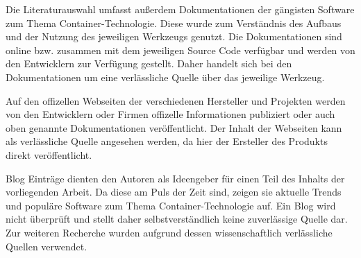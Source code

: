 Die  Literaturauswahl umfasst außerdem Dokumentationen der gängisten Software zum Thema Container-Technologie.
Diese wurde zum Verständnis des Aufbaus und der Nutzung des jeweiligen Werkzeugs genutzt. 
Die Dokumentationen sind online bzw. zusammen mit dem jeweiligen Source Code verfügbar und werden von den Entwicklern zur  Verfügung gestellt. 
Daher handelt sich bei den Dokumentationen um eine verlässliche Quelle über das jeweilige Werkzeug.


Auf den offizellen Webseiten der verschiedenen Hersteller und Projekten werden von den Entwicklern oder Firmen offizelle Informationen publiziert oder auch oben genannte Dokumentationen veröffentlicht. Der Inhalt der Webseiten kann als verlässliche Quelle angesehen werden, da hier der Ersteller des Produkts direkt veröffentlicht.


Blog Einträge dienten den Autoren als Ideengeber für einen Teil des Inhalts der vorliegenden Arbeit.
Da diese am Puls der Zeit sind, zeigen sie aktuelle Trends und populäre Software zum Thema Container-Technologie auf.
Ein Blog wird nicht überprüft und stellt daher selbstverständlich keine zuverlässige Quelle dar.
Zur weiteren Recherche wurden aufgrund dessen wissenschaftlich verlässliche Quellen verwendet.